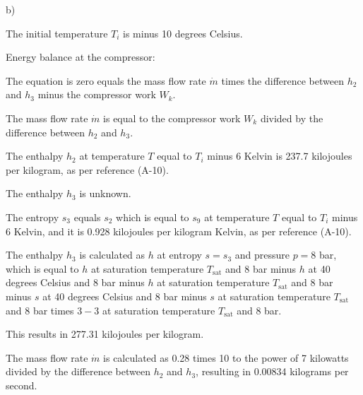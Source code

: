 b)

The initial temperature \( T_i \) is minus 10 degrees Celsius.

Energy balance at the compressor:

The equation is zero equals the mass flow rate \( \dot{m} \) times the difference between \( h_2 \) and \( h_3 \) minus the compressor work \( W_k \).

The mass flow rate \( \dot{m} \) is equal to the compressor work \( W_k \) divided by the difference between \( h_2 \) and \( h_3 \).

The enthalpy \( h_2 \) at temperature \( T \) equal to \( T_i \) minus 6 Kelvin is 237.7 kilojoules per kilogram, as per reference (A-10).

The enthalpy \( h_3 \) is unknown.

The entropy \( s_3 \) equals \( s_2 \) which is equal to \( s_9 \) at temperature \( T \) equal to \( T_i \) minus 6 Kelvin, and it is 0.928 kilojoules per kilogram Kelvin, as per reference (A-10).

The enthalpy \( h_3 \) is calculated as \( h \) at entropy \( s = s_3 \) and pressure \( p = 8 \) bar, which is equal to \( h \) at saturation temperature \( T_{\text{sat}} \) and 8 bar minus \( h \) at 40 degrees Celsius and 8 bar minus \( h \) at saturation temperature \( T_{\text{sat}} \) and 8 bar minus \( s \) at 40 degrees Celsius and 8 bar minus \( s \) at saturation temperature \( T_{\text{sat}} \) and 8 bar times \( 3 - 3 \) at saturation temperature \( T_{\text{sat}} \) and 8 bar.

This results in 277.31 kilojoules per kilogram.

The mass flow rate \( \dot{m} \) is calculated as 0.28 times 10 to the power of 7 kilowatts divided by the difference between \( h_2 \) and \( h_3 \), resulting in 0.00834 kilograms per second.